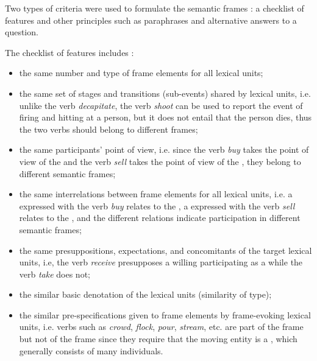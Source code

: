 \documentclass[output=paper,colorlinks,citecolor=brown]{langscibook}
\begin{document}
Two types of criteria were used to formulate the semantic frames \citep[11–17]{Ruppenhofer2016}: a checklist of features and other principles such as paraphrases and alternative answers to a question.


The checklist of features includes \citep[12–14]{Ruppenhofer2016}: 
\begin{itemize}
    \item the same number and type of frame elements for all lexical units; 
    \item the same set of stages and transitions (sub-events) shared by lexical units, i.e. unlike the verb \textit{decapitate}, the verb \textit{shoot} can be used to report the event of firing and hitting at a person, but it does not entail that the person dies, thus the two verbs should belong to different frames;
    \item the same participants' point of view, i.e. since the verb \textit{buy} takes the point of view of the  and the verb \textit{sell} takes the point of view of the , they belong to different semantic frames;
    \item the same interrelations between frame elements for all lexical units, i.e. a  expressed with the verb \textit{buy} relates to the , a  expressed with the verb \textit{sell} relates to the , and the different relations indicate participation in different semantic frames;
    \item the same presuppositions, expectations, and concomitants of the target lexical units, i.e, the verb \emph{receive} presupposes a willing  participating as a  while the verb \emph{take} does not;
    \item the similar basic denotation of the lexical units (similarity of type);
    \item the similar pre-specifications given to frame elements by frame-evoking lexical units, i.e. verbs such as \emph{crowd}, \emph{flock}, \emph{pour}, \emph{stream}, etc. are part of the frame  but not of the frame   since they require that the moving entity is a , which generally consists of many individuals.
\end{itemize}
\end{document}
